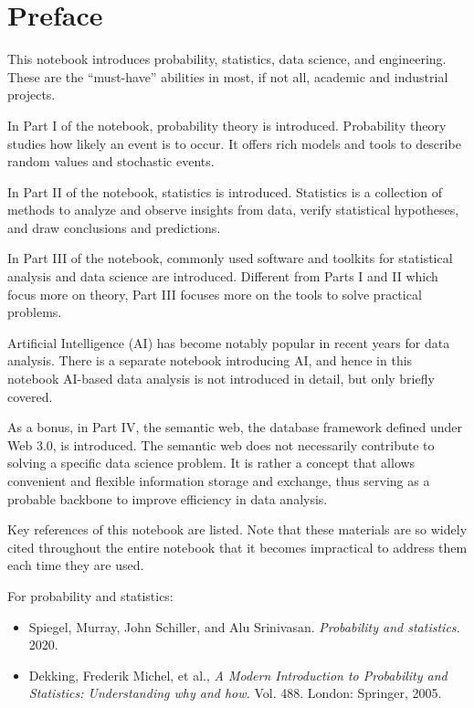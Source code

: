 \chapter*{Preface}

This notebook introduces probability, statistics, data science, and engineering. These are the ``must-have'' abilities in most, if not all, academic and industrial projects.

In Part I of the notebook, probability theory is introduced. Probability theory studies how likely an event is to occur. It offers rich models and tools to describe random values and stochastic events.

In Part II of the notebook, statistics is introduced. Statistics is a collection of methods to analyze and observe insights from data, verify statistical hypotheses, and draw conclusions and predictions.

In Part III of the notebook, commonly used software and toolkits for statistical analysis and data science are introduced. Different from Parts I and II which focus more on theory, Part III focuses more on the tools to solve practical problems. 

Artificial Intelligence (AI) has become notably popular in recent years for data analysis. There is a separate notebook introducing AI, and hence in this notebook AI-based data analysis is not introduced in detail, but only briefly covered.

As a bonus, in Part IV, the semantic web, the database framework defined under Web 3.0, is introduced. The semantic web does not necessarily contribute to solving a specific data science problem. It is rather a concept that allows convenient and flexible information storage and exchange, thus serving as a probable backbone to improve efficiency in data analysis.

Key references of this notebook are listed. Note that these materials are so widely cited throughout the entire notebook that it becomes impractical to address them each time they are used.

For probability and statistics:
\begin{itemize}
  \item Spiegel, Murray, John Schiller, and Alu Srinivasan. \textit{Probability and statistics.} 2020.
  \item Dekking, Frederik Michel, et al., \textit{A Modern Introduction to Probability and Statistics: Understanding why and how.} Vol. 488. London: Springer, 2005.
\end{itemize}

